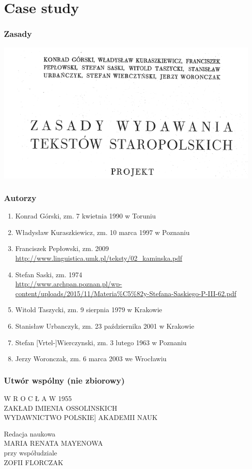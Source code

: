 \documentclass[pdfpagemode=UseNone]{beamer}
\begin{document}
\section{Case study}
\label{sec:case-study}
\begin{frame}
  \frametitle{Zasady}
  \includegraphics[width=\hsize]{img/Zasady-tyt}
\end{frame}

\begin{frame}
  \frametitle{Autorzy}
  \begin{enumerate}
  \item Konrad Górski, zm. 7 kwietnia 1990 w Toruniu
  \item Władysław Kuraszkiewicz, zm. 10 marca 1997 w Poznaniu
  \item Franciszek Pepłowski, zm. 2009\\
    {\url{http://www.linguistica.umk.pl/teksty/02_kaminska.pdf}}
  \item Stefan Saski, zm. 1974\\
    {\url{http://www.archpan.poznan.pl/wp-content/uploads/2015/11/Materia\%C5\%82y-Stefana-Saskiego-P-III-62.pdf}}
\item Witold Taszycki, zm. 9 sierpnia 1979 w Krakowie
\item Stanisław Urbanczyk, zm. 23 października 2001 w Krakowie
\item Stefan [Vrtel-]Wierczynski, zm. 3 lutego 1963 w Poznaniu 
\item Jerzy Woronczak, zm. 6 marca 2003 we Wrocławiu
  \end{enumerate}
\end{frame}

\begin{frame}
  \frametitle{Utwór wspólny (nie zbiorowy)}
W R O C Ł A W 1955\\
ZAKŁAD IMIENIA OSSOLINSKICH\\
WYDAWNICTWO POLSKIE] AKADEMII NAUK

\bigskip
Redacja naukowa\\
MARIA RENATA MAYENOWA\\
przy współudziale\\
ZOFII FLORCZAK\\

\end{frame}
\end{document}

